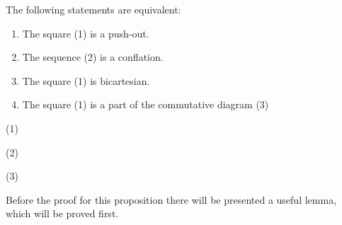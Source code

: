    \begin{prop} 
        The following statements are equivalent:
        \begin{enumerate}
            \item The square (1) is a push-out.
            \item The sequence (2) is a conflation.
            \item The square (1) is bicartesian.
            \item The square (1) is a part of the commutative diagram (3)
        \end{enumerate}
        \begin{center}
            (1)
            \space (2)
            \space (3)
        \end{center}
    \end{prop}

    Before the proof for this proposition there will be presented a useful lemma, which will be proved first.

